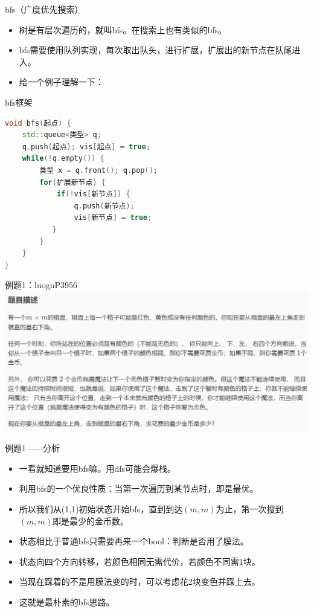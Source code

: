 \documentclass{beamer}[UTF-8]
\begin{document}
\begin{frame}{bfs（广度优先搜索）}
  \pause
\begin{itemize}
  \item 树是有层次遍历的，就叫bfs。在搜索上也有类似的bfs。 \pause
  \item bfs需要使用队列实现，每次取出队头，进行扩展，扩展出的新节点在队尾进入。 \pause
  \item 给一个例子理解一下：
\end{itemize}
\end{frame}

\begin{frame}[fragile]{bfs框架}
\begin{lstlisting}[language = C++,
numberstyle=\tiny,keywordstyle=\color{blue!70},
commentstyle=\color{red!50!green!50!blue!50},frame=shadowbox,
rulesepcolor=\color{red!20!green!20!blue!20},basicstyle=\ttfamily]
void bfs(起点) {
    std::queue<类型> q;
    q.push(起点); vis[起点] = true;
    while(!q.empty()) {
        类型 x = q.front(); q.pop();
        for(扩展新节点) {
            if(!vis[新节点]) {
                q.push(新节点);
                vis[新节点] = true;
           }
        }
    }
}
\end{lstlisting}
\end{frame}

\begin{frame}{例题1：luoguP3956}
\includegraphics[width=\textwidth, height=\textheight]{luoguP3956.png}
\end{frame}

\begin{frame}{例题1——分析}
  \pause
\begin{itemize}
\item 一看就知道要用bfs嘛。用dfs可能会爆栈。 \pause
\item 利用bfs的一个优良性质：当第一次遍历到某节点时，即是最优。 \pause
\item 所以我们从(1,1)初始状态开始bfs，直到到达$(m,m)$为止，第一次搜到$(m,m)$即是最少的金币数。 \pause
\item 状态相比于普通bfs只需要再来一个bool：判断是否用了膜法。 \pause
\item 状态向四个方向转移，若颜色相同无需代价，若颜色不同需1块。 \pause
\item 当现在踩着的不是用膜法变的时，可以考虑花2块变色并踩上去。 \pause
\item 这就是最朴素的bfs思路。
\end{itemize}
\end{frame}
\end{document}
